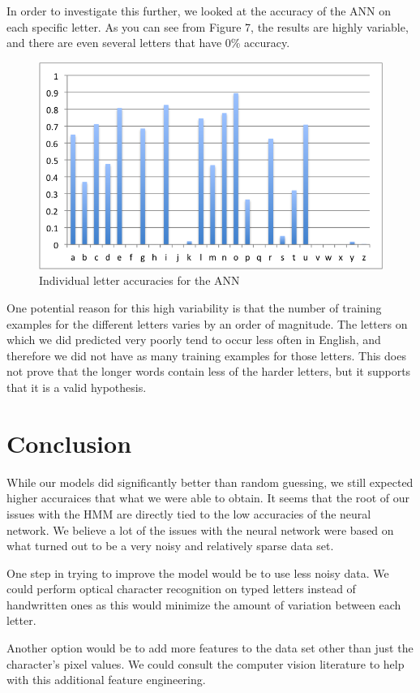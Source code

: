 \documentclass[11pt,a4paper,twocolumn]{article}
\begin{document}
In order to investigate this further, we looked at the accuracy of the ANN on each specific letter. As you can see from Figure 7, the results are highly variable, and there are even several letters that have 0\% accuracy.

\begin{figure}[h]
\centering
\caption{Individual letter accuracies for the ANN}
\includegraphics[scale=0.55]{img/letterPercentages.png}
\end{figure} 

One potential reason for this high variability is that the number of training examples for the different letters varies by an order of magnitude. The letters on which we did predicted very poorly tend to occur less often in English, and therefore we did not have as many training examples for those letters. This does not prove that the longer words contain less of the harder letters, but it supports that it is a valid hypothesis. 


\section{Conclusion}

While our models did significantly better than random guessing, we still expected higher accuraices that what we were able to obtain. It seems that the root of our issues with the HMM are directly tied to the low accuracies of the neural network. We believe a lot of the issues with the neural network were based on what turned out to be a very noisy and relatively sparse data set. 

One step in trying to improve the model would be to use less noisy data. We could perform optical character recognition on typed letters instead of handwritten ones as this would minimize the amount of variation between each letter. 

Another option would be to add more features to the data set other than just the character's pixel values. We could consult the computer vision literature to help with this additional feature engineering. 




\end{document}
